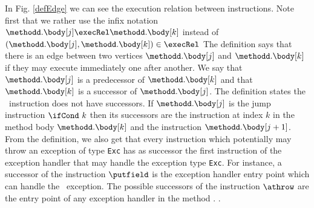 In Fig. \ref{defEdge} we can see the execution relation between instructions.
Note first that we rather use the infix notation $\methodd.\body[j] \execRel \methodd.\body[k]$ instead of $(\methodd.\body[j], \methodd.\body[k]) \in \execRel$  %
 The definition says that there is an edge between two vertices $\methodd.\body[j]$ and  $\methodd.\body[k]$ if they may execute immediately one after another.
 We say that $\methodd.\body[j]$ is a predecessor of $\methodd.\body[k]$ and that  $\methodd.\body[k]$ is a successor of  $\methodd.\body[j]$.
 The definition states the \return \  instruction  does not have successors.
If  $\methodd.\body[j ]$ is the jump instruction $ \ifCond \ k $ then  its successors are the instruction at index $k$ in the method body   
$\methodd.\body[k]$  and the instruction $\methodd.\body[j + 1 ]$. 
From the definition, we also get that every instruction which potentially may throw an exception of type \texttt{Exc}
has as successor the first instruction of the exception handler that may handle the exception type \texttt{Exc}. For instance, a successor
of the instruction $\putfield$ is the exception handler entry point which can handle  the \NullPointerExc \ exception. 
The possible successors of the instruction $\athrow$ are the entry point of any  exception handler  in the method \methodd.
.
